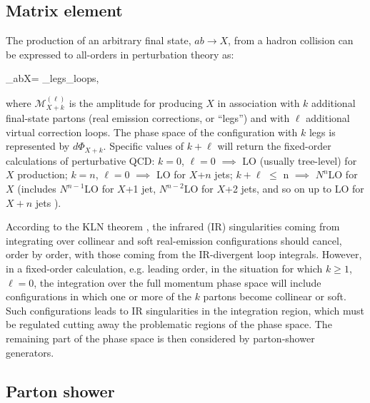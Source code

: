 \subsection{Matrix element}

The production of an arbitrary final state, $ab \to X$, from a hadron collision can be expressed to all-orders in perturbation theory as:

\be
\hat{\sigma}_{ab\to X}= _{\sum \rm legs}_{\sum \rm loops},
\ee

\noindent where $\mathcal{M}_{X+k}^{(\ell)}$ is the amplitude for producing $X$ in association with $k$ additional final-state partons (real emission corrections, or ``legs'')  and with $\ell$ additional virtual correction loops. The phase space of the configuration with $k$ legs is represented by $d\Phi_{X+k}$.  Specific values of $k+\ell$ will return the fixed-order calculations of perturbative QCD:
\bi
\ib $k=0$, $\ell=0$ $\implies$ LO (usually tree-level) for $X$ production;
\ib $k=n$, $\ell=0$ $\implies$ LO for $X$+$n$ jets;
\ib $k+\ell$ $\le$ n $\implies$ $N^{n}$LO for $X$ (includes $N^{n-1}$LO for $X$+1 jet, $N^{n-2}$LO for $X$+2 jets, and so on up to LO for $X+n$ jets ).
\ei


According to the KLN theorem \cite{KLN1,KLN2}, the infrared (IR) singularities coming from integrating over collinear and soft real-emission configurations should cancel, order by order, with those coming from the IR-divergent loop integrals.
However, in a fixed-order calculation, e.g. leading order, in the situation for which $k\ge1$, $\ell=0$, the integration over the full momentum phase space will include configurations in which one or more of the $k$ partons become collinear or soft. Such configurations leads to IR singularities in the integration region, which must be regulated cutting away the problematic regions of the phase space. The remaining part of the phase space is then considered by parton-shower generators.


\subsection{Parton shower}

